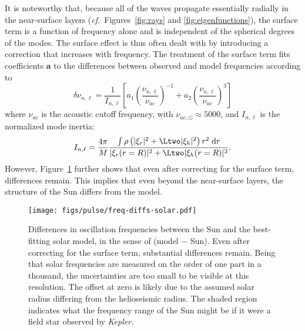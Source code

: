 It is noteworthy that, because all of the waves propagate essentially radially in the near-surface layers (\emph{cf.}~Figures~\ref{fig:rays} and \ref{fig:eigenfunctions}), the surface term is a function of frequency alone and is independent of the spherical degrees of the modes. 
The surface effect is thus often dealt with by introducing a correction that increases with frequency. %
The \citet{2014A&A...568A.123B} treatment of the surface term fits coefficients $\mathbf a$ to the differences between observed and model frequencies according to
\begin{equation} \label{eq:BallGizon-surfterm}
    \delta \nu_{n,\ell} 
    = 
    \frac{1}{I_{n,\ell}} \left[ 
        a_1 \left( 
            \frac{\nu_{n,\ell}}{\nu_{ac}} 
        \right)^{-1} 
        + 
        a_2 \left( 
            \frac{\nu_{n,\ell}}{\nu_{ac}} 
        \right)^{3} 
    \right] %
\end{equation}
where $\nu_{ac}$ is the acoustic cutoff frequency, with ${\nu_{ac,\odot} \approx 5000}$, and $I_{n,\ell}$ is the normalized mode inertia:
\begin{equation} \label{eq:normalized-mode-inertia}
    I_{n,\ell}
    =
    \frac{4\pi}{M}
    \frac{\int \rho
            \left(
                |\xi_r|^2
                +
                \Ltwo |\xi_h|^2
            \right) 
            r^2
        \;\text{d}r}{
            |\xi_r(r=R)|^2
            +
            \Ltwo
            |\xi_h(r=R)|^2
        }.
\end{equation}
However, Figure~\ref{fig:solar_freq_diffs} further shows that even after correcting for the surface term, differences remain. 
This implies that even beyond the near-surface layers, the structure of the Sun differs from the model. 

\begin{figure}[t]
    \centering
    \texttt{[image: figs/pulse/freq-diffs-solar.pdf]}%
    \caption[The solar surface effect]{Differences in oscillation frequencies between the Sun and the best-fitting solar model, in the sense of (model $-$ Sun). 
    Even after correcting for the surface term, substantial differences remain. 
    Being that solar frequencies are measured on the order of one part in a thousand, the uncertainties are too small to be visible at this resolution. 
    The offset at zero is likely due to the assumed solar radius differing from the helioseismic radius. 
    The shaded region indicates what the frequency range of the Sun might be if it were a field star observed by \emph{Kepler}. 
    \label{fig:solar_freq_diffs}} 
\end{figure} 


